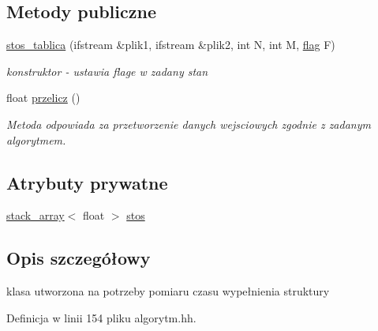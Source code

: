 \subsection*{\-Metody publiczne}
\begin{DoxyCompactItemize}
\item 
\hyperlink{classstos__tablica_a74b6909e896922fd4ebb355e1e996523}{stos\-\_\-tablica} (ifstream \&plik1, ifstream \&plik2, int \-N, int \-M, \hyperlink{stos_8hh_a7847560c748814fd3070e9149a9578bd}{flag} \-F)
\begin{DoxyCompactList}\small\item\em konstruktor -\/ ustawia flage w zadany stan \end{DoxyCompactList}\item 
float \hyperlink{classstos__tablica_a44ec89c9723d4034e46ae3b51b01faea}{przelicz} ()
\begin{DoxyCompactList}\small\item\em \-Metoda odpowiada za przetworzenie danych wejsciowych zgodnie z zadanym algorytmem. \end{DoxyCompactList}\end{DoxyCompactItemize}
\subsection*{\-Atrybuty prywatne}
\begin{DoxyCompactItemize}
\item 
\hyperlink{classstack__array}{stack\-\_\-array}$<$ float $>$ \hyperlink{classstos__tablica_a8aa72aa52bd2436cb12d9e1c8e077389}{stos}
\end{DoxyCompactItemize}


\subsection{\-Opis szczegółowy}
klasa utworzona na potrzeby pomiaru czasu wypełnienia struktury 

\-Definicja w linii 154 pliku algorytm.\-hh.



